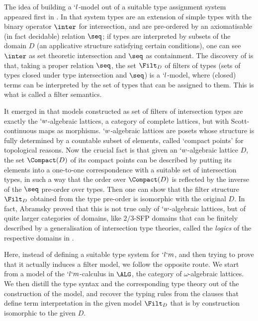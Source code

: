 \documentclass{CSML}
\begin{document}
The idea of building a $`l$-model out of a suitable type assignment system appeared first in \cite{BCD'83}. In that system types are an extension of simple types with the binary operator $\inter$ for intersection, and are pre-ordered by an axiomatisable (in fact decidable) relation $\seq$; if types are interpreted by subsets of the domain $D$ (an applicative structure satisfying certain conditions), one can see $\inter$ as set theoretic intersection and $\seq$ as containment. The discovery of \cite{BCD'83} is that, taking a proper relation $\seq$, the set $\Filt_D$ of filters of types (sets of types closed under type intersection and $\seq$) is a $`l$-model, where (closed) terms can be interpreted by the set of types that can be assigned to them. This is what is called a filter semantics.

It emerged in \cite{Coppo-et.al'84} that models constructed as set of filters of intersection types are exactly the $`w$-algebraic lattices, a category of complete lattices, but with Scott-continuous maps as morphisms. 
$`w$-algebraic lattices are posets whose structure is fully determined by a countable subset of elements, called `compact points' for topological reasons.
Now the crucial fact is that given an $`w$-algebraic lattice $D$, the set $\Compact(D)$ of its compact points can be described by putting its elements into a one-to-one correspondence with a suitable set of intersection types, in such a way that the order over $\Compact(D)$ is reflected by the inverse of the $\seq$ pre-order over types. 
Then one can show that the filter structure $\Filt_D$ obtained from the type pre-order is isomorphic with the original $D$. 
In fact, Abramsky proved that this is not true only of $`w$-algebraic lattices, but of quite
larger categories of domains, like $2/3$-SFP domains that can be finitely described by a generalisation of intersection type theories, called the \emph{logics} of the respective domains in \cite{Abramsky'91}.

Here, instead of defining a suitable type system for $`l`m$, and then trying to prove that it actually induces a filter model, we follow the opposite route. 
We start from a model of the $`l`m$-calculus in $\ALG$, the category of $\omega$-algebraic lattices. 
We then distill the type syntax and the corresponding type theory out of the construction of the model, and recover the typing rules from the clauses that define term interpretation in the given model $\Filt_D$ that is by construction isomorphic to the given $D$.
\end{document}
